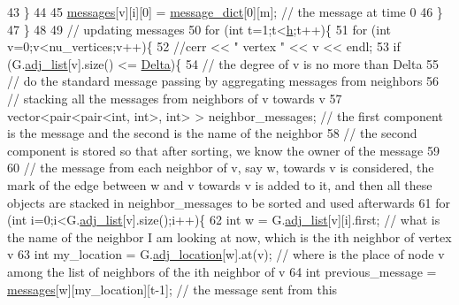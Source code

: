 \begin{DoxyCode}
43       \}
44 
45       \hyperlink{classgraph__message_aac77e098f0acf9650116a8e51fe3b4b7}{messages}[v][i][0] = \hyperlink{classgraph__message_ad0a6d35ac8550fb7ff03ce90fce7d5a5}{message\_dict}[0][m]; \textcolor{comment}{// the message at time 0}
46     \}
47   \}
48 
49   \textcolor{comment}{// updating messages}
50   \textcolor{keywordflow}{for} (\textcolor{keywordtype}{int} t=1;t<\hyperlink{classgraph__message_a934d63ed7275c211e13c6fb68824ed46}{h};t++)\{
51     \textcolor{keywordflow}{for} (\textcolor{keywordtype}{int} v=0;v<nu\_vertices;v++)\{
52       \textcolor{comment}{//cerr << " vertex " << v << endl;}
53       \textcolor{keywordflow}{if} (G.\hyperlink{classmarked__graph_a1a0bf7ca413a278763f7c878b3b6fd6f}{adj\_list}[v].size() <= \hyperlink{classgraph__message_a45dfd061b7bc73572e5132fbf66efd55}{Delta})\{
54         \textcolor{comment}{// the degree of v is no more than Delta}
55         \textcolor{comment}{// do the standard message passing by aggregating messages from neighbors}
56         \textcolor{comment}{// stacking all the messages from neighbors of v towards v}
57         vector<pair<pair<int, int>, \textcolor{keywordtype}{int}> > neighbor\_messages; \textcolor{comment}{// the first component is the message and the
       second is the name of the neighbor}
58         \textcolor{comment}{// the second component is stored so that after sorting, we know the owner of the message}
59 
60         \textcolor{comment}{// the message from each neighbor of v, say w,  towards v is considered, the mark of the edge
       between w and v towards v is added to it, and then all these objects are stacked in neighbor\_messages to be
       sorted and used afterwards }
61         \textcolor{keywordflow}{for} (\textcolor{keywordtype}{int} i=0;i<G.\hyperlink{classmarked__graph_a1a0bf7ca413a278763f7c878b3b6fd6f}{adj\_list}[v].size();i++)\{
62           \textcolor{keywordtype}{int} w = G.\hyperlink{classmarked__graph_a1a0bf7ca413a278763f7c878b3b6fd6f}{adj\_list}[v][i].first; \textcolor{comment}{// what is the name of the neighbor I am looking at now,
       which is the ith neighbor of vertex v }
63           \textcolor{keywordtype}{int} my\_location = G.\hyperlink{classmarked__graph_a3ae722ea9583ad23af34d789a88ac01a}{adj\_location}[w].at(v); \textcolor{comment}{// where is the place of node v among the
       list of neighbors of the ith neighbor of v}
64           \textcolor{keywordtype}{int} previous\_message = \hyperlink{classgraph__message_aac77e098f0acf9650116a8e51fe3b4b7}{messages}[w][my\_location][t-1]; \textcolor{comment}{// the message sent from this
}
\end{DoxyCode}
